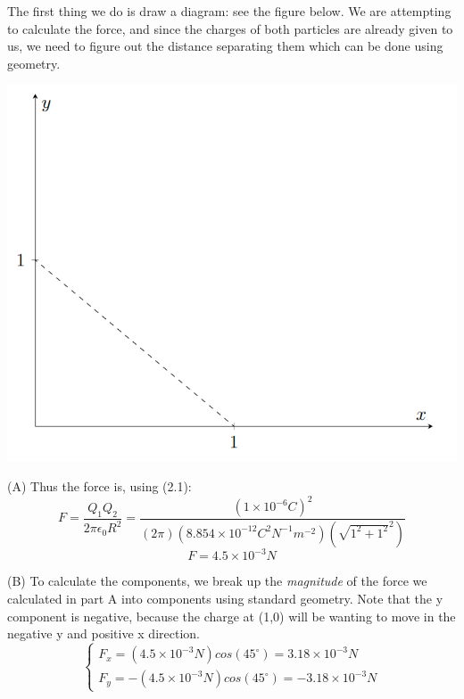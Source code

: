 \begin{solution}

The first thing we do is draw a diagram: see the figure below. We are attempting to calculate the force, and since the charges of both particles are already given to us, we need to figure out the distance separating them which can be done using geometry.

\begin{center}

\includegraphics[scale=0.9]{Figures/Figure26}
\end{center}
(A) Thus the force is, using (2.1):
\begin{equation*}
    F=\frac{Q_1Q_2}{2\pi\epsilon_0R^2}=
    \frac{(1 \times 10^{-6}C)^2}
    {(2\pi)(8.854 \times 10^{-12}C^2N^{-1}m^{-2})(\sqrt{1^2 + 1^2}^2)}
\end{equation*}
\begin{equation*}
    F = 4.5 \times 10^{-3} N
\end{equation*}

(B) To calculate the components, we break up the \emph{magnitude} of the force we calculated in part A into components using standard geometry. Note that the y component is negative, because the charge at (1,0) will be wanting to move in the negative y and positive x direction.
\begin{equation*}
    \left\{
        \begin{array}{ll}
            F_x = (4.5 \times 10^{-3} N)cos(45^\circ) = 3.18 \times 10^{-3} N
            \\
            F_y = -(4.5 \times 10^{-3} N)cos(45^\circ) = -3.18 \times 10^{-3} N
        \end{array}
              \right.
\end{equation*}


\end{solution}
